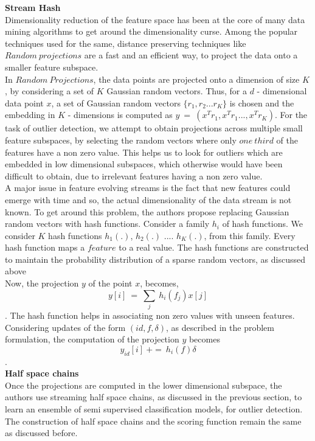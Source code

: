 \noindent \textbf{Stream Hash} \\

Dimensionality reduction of the feature space has been at the core of many data mining algorithms to get around the dimensionality curse. Among the popular techniques used for the same, distance preserving techniques like $Random\ projections$ are a fast and an efficient way, to project the data onto a smaller feature subspace. \\

In $Random\ Projections$, the data points are projected onto a dimension of size $K$, by considering a set of $K$ Gaussian random vectors. Thus, for a $d$ - dimensional data point $x$, a set of Gaussian random vectors $\{r_1,r_2...r_K\}$ is chosen and the embedding in $K$ - dimensions is computed as $y\ =\ (x^Tr_1,x^Tr_1...,x^Tr_K)$. For the task of outlier detection, we attempt to obtain projections across multiple small feature subspaces, by selecting the random vectors where only $one\ third$ of the features have a non zero value. This helps us to look for outliers which are embedded in low dimensional subspaces, which otherwise would have been difficult to obtain, due to irrelevant features having a non zero value. \\

A major issue in feature evolving streams is the fact that new features could emerge with time and so, the actual dimensionality of the data stream is not known. To get around this problem, the authors propose replacing Gaussian random vectors with hash functions. Consider a family $h_i$ of hash functions. We consider $K$ hash functions $h_1(.)$, $h_2(.)$ .... $h_K(.)$, from this family. Every hash function maps a $feature$ to a real value. The hash functions are constructed to maintain the probability distribution of a sparse random vectors, as discussed above \\

Now, the projection $y$ of the point $x$, becomes, $$y[i]\ =\ \sum_{j}\ h_i(f_j)x[j]$$. The hash function helps in associating non zero values with unseen features. Considering updates of the form $(id, f, \delta)$, as described in the problem formulation, the computation of the projection $y$ becomes $$y_{id}[i]\ +=\ h_i(f)\delta$$. \\

\noindent \textbf{Half space chains} \\

Once the projections are computed in the lower dimensional subspace, the authors use streaming half space chains, as discussed in the previous section, to learn an ensemble of semi supervised classification models, for outlier detection. The construction of half space chains and the scoring function remain the same as discussed before. \\


